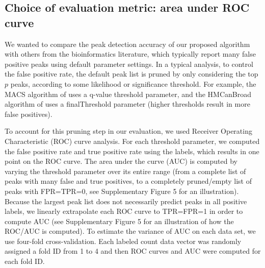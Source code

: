 \documentclass[twoside,11pt]{article}
\begin{document}
\subsection{Choice of evaluation metric: area under ROC curve}

We wanted to compare the peak detection accuracy of our proposed
algorithm with others from the bioinformatics literature, which
typically report many false positive peaks using default parameter
settings. 
In a typical analysis, to control the false
positive rate, the default peak list is pruned by only considering the
top $p$ peaks, according to some likelihood or significance
threshold. For example, the MACS algorithm of \citet{MACS} uses a
q-value threshold parameter, and the HMCanBroad algorithm of
\citet{HMCan} uses a finalThreshold parameter (higher thresholds
result in more false positives).

To account for this pruning step in our evaluation, we used Receiver
Operating Characteristic (ROC) curve analysis. For each threshold
parameter, we computed the false positive rate and true positive rate
using the labels, which results in one point on the ROC curve. The
area under the curve (AUC) is computed by varying the threshold
parameter over its entire range (from a complete list of peaks with
many false and true positives, to a completely pruned/empty list of
peaks with FPR=TPR=0, see Supplementary Figure 5 for an illustration).
Because the largest peak list does not necessarily predict peaks in
all positive labels, we linearly extrapolate each ROC curve to
TPR=FPR=1 in order to compute AUC (see Supplementary Figure 5 for an
illustration of how the ROC/AUC is computed). To estimate the variance
of AUC on each data set, we use four-fold cross-validation. Each
labeled count data vector was randomly assigned a fold ID from 1 to 4
and then ROC curves and AUC were computed for each fold ID.

\end{document}
